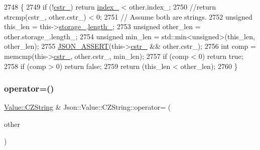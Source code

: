 \begin{DoxyCode}
2748                                                          \{
2749   \textcolor{keywordflow}{if} (!\hyperlink{class_json_1_1_value_1_1_c_z_string_a5b4d28349294034d7f779c3c95d0306c}{cstr\_}) \textcolor{keywordflow}{return} \hyperlink{class_json_1_1_value_1_1_c_z_string_aecf29982235c9c165a0971023ebbb270}{index\_} < other.index\_;
2750   \textcolor{comment}{//return strcmp(cstr\_, other.cstr\_) < 0;}
2751   \textcolor{comment}{// Assume both are strings.}
2752   \textcolor{keywordtype}{unsigned} this\_len = this->\hyperlink{class_json_1_1_value_1_1_c_z_string_a17c92f0f089a4314e3b1d5695dc1a851}{storage\_}.\hyperlink{struct_json_1_1_value_1_1_c_z_string_1_1_string_storage_a165d865c44e6471d34668eeb4f15b140}{length\_};
2753   \textcolor{keywordtype}{unsigned} other\_len = other.storage\_.length\_;
2754   \textcolor{keywordtype}{unsigned} min\_len = std::min<unsigned>(this\_len, other\_len);
2755   \hyperlink{json_8h_a188941dcc789ccb6539c3d6f41405582}{JSON\_ASSERT}(this->\hyperlink{class_json_1_1_value_1_1_c_z_string_a5b4d28349294034d7f779c3c95d0306c}{cstr\_} && other.cstr\_);
2756   \textcolor{keywordtype}{int} comp = memcmp(this->\hyperlink{class_json_1_1_value_1_1_c_z_string_a5b4d28349294034d7f779c3c95d0306c}{cstr\_}, other.cstr\_, min\_len);
2757   \textcolor{keywordflow}{if} (comp < 0) \textcolor{keywordflow}{return} \textcolor{keyword}{true};
2758   \textcolor{keywordflow}{if} (comp > 0) \textcolor{keywordflow}{return} \textcolor{keyword}{false};
2759   \textcolor{keywordflow}{return} (this\_len < other\_len);
2760 \}
\end{DoxyCode}
\mbox{\label{class_json_1_1_value_1_1_c_z_string_a6513ff431b0593d5744868dfee739f7b}} 
\subsubsection{\texorpdfstring{operator=()}{operator=()}}
{\footnotesize\ttfamily \hyperlink{class_json_1_1_value_1_1_c_z_string}{Value\+::\+C\+Z\+String} \& Json\+::\+Value\+::\+C\+Z\+String\+::operator= (\begin{DoxyParamCaption}\item[{\hyperlink{class_json_1_1_value_1_1_c_z_string}{C\+Z\+String}}]{other }\end{DoxyParamCaption})}



